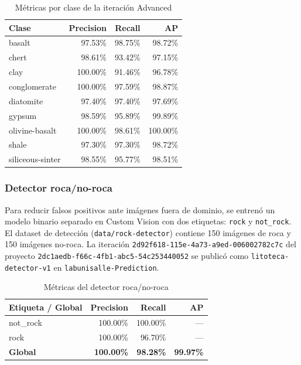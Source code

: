 \begin{table}[H]
  \centering
  \caption{Métricas por clase de la iteración Advanced}
  \label{tab:metricas-clase}
  \begin{tabular}{@{}lrrr@{}}
    \toprule
    Clase & Precision & Recall & AP \\
    \midrule
    basalt & 97.53\% & 98.75\% & 98.72\% \\
    chert & 98.61\% & 93.42\% & 97.15\% \\
    clay & 100.00\% & 91.46\% & 96.78\% \\
    conglomerate & 100.00\% & 97.59\% & 98.87\% \\
    diatomite & 97.40\% & 97.40\% & 97.69\% \\
    gypsum & 98.59\% & 95.89\% & 99.89\% \\
    olivine-basalt & 100.00\% & 98.61\% & 100.00\% \\
    shale & 97.30\% & 97.30\% & 98.72\% \\
    siliceous-sinter & 98.55\% & 95.77\% & 98.51\% \\
    \bottomrule
  \end{tabular}
\end{table}

\subsubsection{Detector roca/no-roca}

Para reducir falsos positivos ante imágenes fuera de dominio, se entrenó un modelo
binario separado en Custom Vision con dos etiquetas: \texttt{rock} y
\texttt{not\_rock}. El dataset de detección (\texttt{data/rock-detector}) contiene
150 imágenes de roca y 150 imágenes no-roca. La iteración
\texttt{2d92f618-115e-4a73-a9ed-006002782c7c} del proyecto
\texttt{2dc1aedb-f66c-4fb1-abc5-54c253440052} se publicó como
\texttt{litoteca-detector-v1} en \texttt{labunisalle-Prediction}.

\begin{table}[H]
  \centering
  \caption{Métricas del detector roca/no-roca}
  \label{tab:detector-metricas}
  \begin{tabular}{@{}lrrr@{}}
    \toprule
    Etiqueta / Global & Precision & Recall & AP \\
    \midrule
    not\_rock & 100.00\% & 100.00\% & --- \\
    rock & 100.00\% & 96.70\% & --- \\
    \midrule
    \textbf{Global} & \textbf{100.00\%} & \textbf{98.28\%} & \textbf{99.97\%} \\
    \bottomrule
  \end{tabular}
\end{table}

